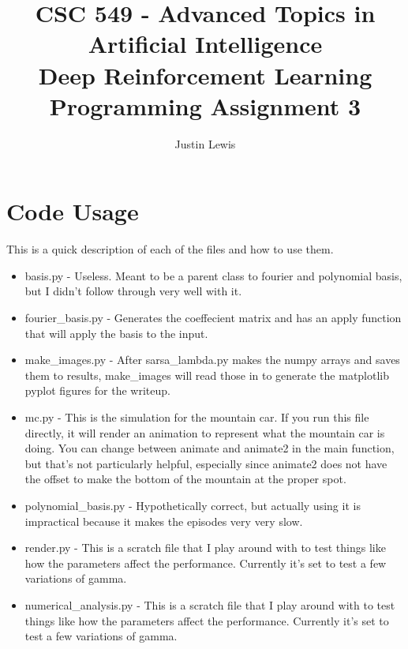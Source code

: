 \documentclass{article}
\title{\Large CSC 549 - Advanced Topics in Artificial Intelligence\\\large Deep Reinforcement Learning\\\normalsize Programming Assignment 3}
\author{Justin Lewis}
\begin{document}
\maketitle
\tableofcontents
\newpage
\section{Code Usage}
This is a quick description of each of the files and how to use them. 

\begin{itemize}
    \item basis.py - Useless. Meant to be a parent class
        to fourier and polynomial basis, but I didn't
        follow through very well with it. 

    \item fourier\_basis.py - Generates the coeffecient matrix and has an apply function that will apply the basis to the input. 

    \item make\_images.py - After sarsa\_lambda.py makes the numpy arrays and saves them to results, make\_images will read those in to generate the matplotlib pyplot figures for the writeup.

    \item mc.py - This is the simulation for the mountain
        car. If you run this file directly, it will render
        an animation to represent what the mountain car is
        doing. You can change between animate and animate2
        in the main function, but that's not particularly
        helpful, especially since animate2 does not have
        the offset to make the bottom of the mountain at
        the proper spot. 

    \item polynomial\_basis.py - Hypothetically correct,
        but actually using it is impractical because it
        makes the episodes very very slow. 

    \item render.py - This is a scratch file that I play around with to test things like 
        how the parameters affect the performance. Currently it's set to test a few variations
        of gamma. 

    \item numerical\_analysis.py - This is a scratch file that I play around with to test things like 
        how the parameters affect the performance. Currently it's set to test a few variations
        of gamma. 


\end{itemize}
\end{document}

